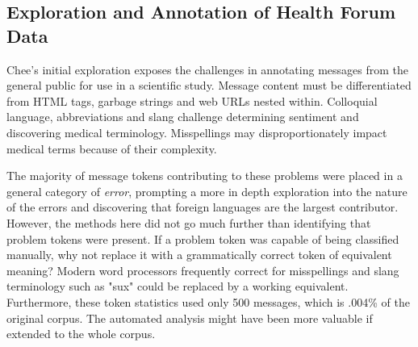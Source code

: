 \documentclass[twoside,11pt]{article}
\begin{document}
\subsection{Exploration and Annotation of Health Forum Data}
Chee's initial exploration exposes the challenges in annotating messages from the general public for use in a scientific study. Message content must be differentiated from HTML tags, garbage strings and web URLs nested within. Colloquial language, abbreviations and slang challenge determining sentiment and discovering medical terminology. Misspellings may disproportionately impact medical terms because of their complexity.
\par The majority of message tokens contributing to these problems were placed in a general category of \textit{error}, prompting a more in depth exploration into the nature of the errors and discovering that foreign languages are the largest contributor. However, the methods here did not go much further than identifying that problem tokens were present. If a problem token was capable of being classified manually, why not replace it with a grammatically correct token of equivalent meaning? Modern word processors frequently correct for misspellings and slang terminology such as "sux" could be replaced by a working equivalent. Furthermore, these token statistics used only 500 messages, which is .004\% of the original corpus. The automated analysis might have been more valuable if extended to the whole corpus.
\end{document}
